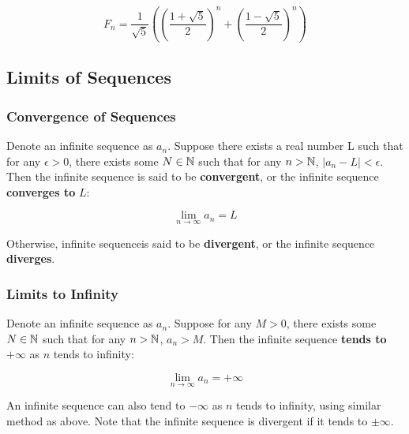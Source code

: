 \documentclass[a4paper,12pt]{article}
\begin{document}
$$F_{n}=\frac{1}{\sqrt{5}}\left( \left( \frac{1+\sqrt{5}}{2}\right) ^{n}+\left( \frac{1-\sqrt{5}}{2}\right) ^{n}\right)$$

\subsection{Limits of Sequences}
\subsubsection{Convergence of Sequences}
\begin{dft}
  Denote an infinite sequence as $a_{n}$. Suppose there exists a real number L such that for any $\epsilon>0$, there exists some $N\in \mathbb{N}$ such that for any $n>\mathbb{N}$, $\left| a_{n}-L\right| <\epsilon$. Then the infinite sequence is said to be \textbf{convergent}, or the infinite sequence \textbf{converges to} $L$:

  $$\lim_{n\to \infty}a_{n}=L$$\s

  Otherwise, infinite sequenceis said to be \textbf{divergent}, or the infinite sequence \textbf{diverges}.
\end{dft}

\subsubsection{Limits to Infinity}
\begin{dft}
  Denote an infinite sequence as $a_{n}$. Suppose for any $M>0$, there exists some $N\in \mathbb{N}$ such that for any $n>\mathbb{N}$, $a_{n}>M$. Then the infinite sequence \textbf{tends to} $+\infty$ as $n$ tends to infinity:

  $$\lim_{n\to \infty}a_{n}=+\infty$$
\end{dft}\n

An infinite sequence can also tend to $-\infty$ as $n$ tends to infinity, using similar method as above. Note that the infinite sequence is divergent if it tends to $\pm \infty$.
\end{document}
